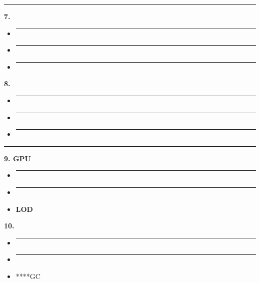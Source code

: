 \begin{center}\rule{0.5\linewidth}{0.5pt}\end{center}

\textbf{7. }

\begin{itemize}
\item
  \begin{center}\rule{0.5\linewidth}{0.5pt}\end{center}
\item
  \begin{center}\rule{0.5\linewidth}{0.5pt}\end{center}
\item
  \begin{center}\rule{0.5\linewidth}{0.5pt}\end{center}
\end{itemize}

\textbf{8. }

\begin{itemize}
\item
  \begin{center}\rule{0.5\linewidth}{0.5pt}\end{center}
\item
  \begin{center}\rule{0.5\linewidth}{0.5pt}\end{center}
\item
  \begin{center}\rule{0.5\linewidth}{0.5pt}\end{center}
\end{itemize}

\begin{center}\rule{0.5\linewidth}{0.5pt}\end{center}

\textbf{9. GPU}

\begin{itemize}
\item
  \begin{center}\rule{0.5\linewidth}{0.5pt}\end{center}
\item
  \begin{center}\rule{0.5\linewidth}{0.5pt}\end{center}
\item
  \textbf{LOD}
\end{itemize}

\textbf{10. }

\begin{itemize}
\item
  \begin{center}\rule{0.5\linewidth}{0.5pt}\end{center}
\item
  \begin{center}\rule{0.5\linewidth}{0.5pt}\end{center}
\item
  ****GC
\end{itemize}

